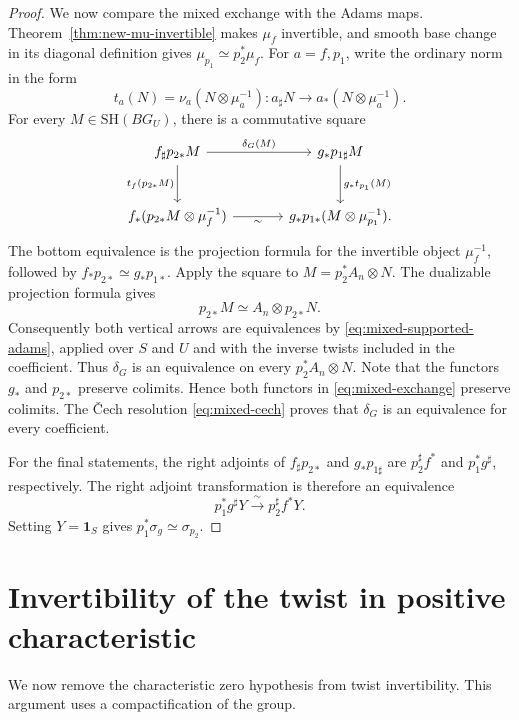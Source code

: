 \documentclass[11pt,reqno]{amsart}
\theoremstyle{definition}
\theoremstyle{remark}
\theoremstyle{plain}
\numberwithin{equation}{section}
\newcommand{\SH}{\mathrm{SH}}
\newcommand{\one}{\mathbf 1}
\begin{document}
\begin{proof}
We now compare the mixed exchange with the Adams maps.
Theorem~\ref{thm:new-mu-invertible} makes \(\mu_f\) invertible, and
smooth base change in its diagonal definition gives
\(\mu_{p_1}\simeq p_2^*\mu_f\).
For \(a=f,p_1\), write the ordinary norm in the form
\[
 t_a(N)=\nu_a(N\otimes\mu_a^{-1}):
 a_\sharp N\longrightarrow a_*(N\otimes\mu_a^{-1}).
\]
For every \(M\in\SH(BG_U)\), there is a commutative square
\begin{equation}\label{eq:mixed-adams-square}
\begin{tikzcd}[column sep=large,row sep=large]
 f_\sharp p_{2*}M
   \arrow[r,"\delta_G(M)"]
   \arrow[d,"t_f(p_{2*}M)"']
 & g_*p_{1\sharp}M
   \arrow[d,"g_*t_{p_1}(M)"] \\
 f_*(p_{2*}M\otimes\mu_f^{-1})
   \arrow[r,"\sim"']
 & g_*p_{1*}(M\otimes\mu_{p_1}^{-1}).
\end{tikzcd}
\end{equation}
The bottom equivalence is the projection formula for the invertible
object \(\mu_f^{-1}\), followed by
\(f_*p_{2*}\simeq g_*p_{1*}\).
Apply the square to \(M=p_2^*A_n\otimes N\).
The dualizable projection formula gives
\[
 p_{2*}M\simeq A_n\otimes p_{2*}N.
\]
Consequently both vertical arrows are equivalences by
\eqref{eq:mixed-supported-adams}, applied over \(S\) and \(U\)
and with the inverse twists included in the coefficient.
Thus \(\delta_G\) is an equivalence on every \(p_2^*A_n\otimes N\).
Note that the functors \(g_*\) and \(p_{2*}\) preserve colimits.
Hence both functors in \eqref{eq:mixed-exchange} preserve colimits.
The \v{C}ech resolution \eqref{eq:mixed-cech} proves that
\(\delta_G\) is an equivalence for every coefficient.

For the final statements, the right adjoints of \(f_\sharp p_{2*}\) 
and \(g_*p_{1\sharp}\) are
\(p_2^\sharp f^*\) and \(p_1^*g^\sharp\), respectively.
The right adjoint transformation is therefore an equivalence
\[
 p_1^*g^\sharp Y\xrightarrow{\ \sim\ }p_2^\sharp f^*Y.
\]
Setting \(Y=\one_S\) gives
\(p_1^*\sigma_g\simeq\sigma_{p_2}\).
\end{proof}



\section{Invertibility of the twist in positive characteristic}
\label{subsec:new-charp-twist}

We now remove the characteristic zero hypothesis from twist invertibility.
This argument uses a compactification of the group.
\end{document}
